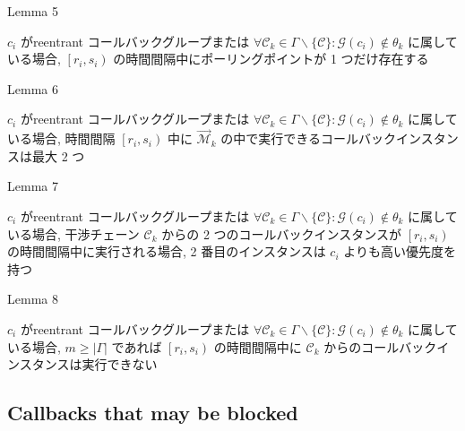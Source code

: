 \begin{frame}[label=lemma5]{Lemma 5}
    \begin{lemma}[]
        $c_{i}$ がreentrant コールバックグループまたは $\forall \mathcal{C}_{k} \in \Gamma \backslash\{\mathcal{C}\}: \mathcal{G}\left(c_{i}\right) \notin \theta_{k}$ に属している場合, $\left[r_{i}, s_{i}\right)$ の時間間隔中にポーリングポイントが 1 つだけ存在する
    \end{lemma}
\end{frame}


\begin{frame}[label=lemma6]{Lemma 6}
    \begin{lemma}[]
        $c_{i}$ がreentrant コールバックグループまたは $\forall \mathcal{C}_{k} \in \Gamma \backslash\{\mathcal{C}\}: \mathcal{G}\left(c_{i}\right) \notin \theta_{k}$ に属している場合, 時間間隔 $\left[r_{i}, s_{i}\right)$ 中に $\overrightarrow{\mathcal{M}}_{k}$ の中で実行できるコールバックインスタンスは最大 2 つ
    \end{lemma}
\end{frame}

\begin{frame}[label=lemma7]{Lemma 7}
    \begin{lemma}[]
        $c_{i}$ がreentrant コールバックグループまたは $\forall \mathcal{C}_{k} \in \Gamma \backslash\{\mathcal{C}\}: \mathcal{G}\left(c_{i}\right) \notin \theta_{k}$ に属している場合, 干渉チェーン $\mathcal{C}_{k}$ からの 2 つのコールバックインスタンスが $\left[r_{i}, s_{i}\right)$ の時間間隔中に実行される場合, 2 番目のインスタンスは $c_{i}$ よりも高い優先度を持つ
    \end{lemma}
\end{frame}

\begin{frame}[label=lemma8]{Lemma 8}
    \begin{lemma}[]
        $c_{i}$ がreentrant コールバックグループまたは $\forall \mathcal{C}_{k} \in \Gamma \backslash\{\mathcal{C}\}: \mathcal{G}\left(c_{i}\right) \notin \theta_{k}$ に属している場合, $m \geq|\Gamma|$ であれば $\left[r_{i}, s_{i}\right)$ の時間間隔中に $\mathcal{C}_{k}$ からのコールバックインスタンスは実行できない
    \end{lemma}
\end{frame}


\subsection{Callbacks that may be blocked}
\label{ssec: callbacks_that_may_be_blocked}

